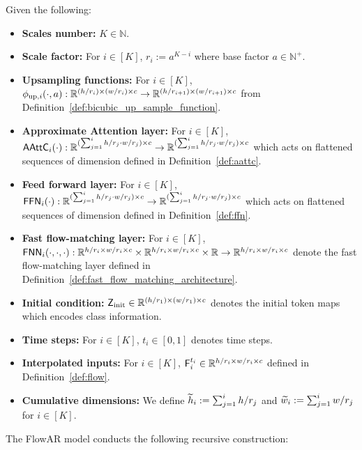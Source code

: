 \begin{definition}\label{def:fast_flow_architecture_inference}
    Given the following:
    \begin{itemize}
        \item {\bf Scales number:} $K \in \mathbb{N}$.
        \item {\bf Scale factor:} For $i \in [K]$, $r_i:= a^{K-i}$ where base factor $a \in \mathbb{N}^+$.
        \item {\bf Upsampling functions:}  For $i \in [K]$, $\phi_{\mathrm{up},i}(\cdot,a): \mathbb{R}^{(h/r_i) \times (w/r_i) \times c}\to \mathbb{R}^{(h/r_{i+1}) \times (w/r_{i+1}) \times c}$ from Definition~\ref{def:bicubic_up_sample_function}.
        \item {\bf Approximate Attention layer:}  For $i \in [K]$, $\mathsf{AAttC}_i(\cdot):\mathbb{R}^{(\sum_{j=1}^i h/r_j \cdot w/r_{j})\times c} \to \mathbb{R}^{(\sum_{j=1}^i h/r_j \cdot w/r_{j})\times c}$ which acts on flattened sequences of dimension defined in Definition~\ref{def:aattc}.
        \item {\bf Feed forward layer: } For $i \in [K]$, $\mathsf{FFN}_i(\cdot): \mathbb{R}^{(\sum_{j=1}^i h/r_j \cdot w/r_{j})\times c} \to \mathbb{R}^{(\sum_{j=1}^i h/r_j \cdot w/r_{j})\times c}$ which acts on flattened sequences of dimension defined in Definition~\ref{def:ffn}.
        \item {\bf Fast flow-matching layer:} For $i \in [K]$, $\mathsf{FNN}_i(\cdot,\cdot,\cdot):\mathbb{R}^{h/r_i \times w/r_i \times c}\times \mathbb{R}^{h/r_i \times w/r_i \times c}\times \mathbb{R} \to \mathbb{R}^{h/r_i \times w/r_i \times c}$ denote the fast flow-matching layer defined in Definition~\ref{def:fast_flow_matching_architecture}.
        \item {\bf Initial condition:} $\mathsf{Z}_{\mathrm{init}} \in \mathbb{R}^{(h/r_1) \times (w/r_1) \times c}$ denotes the initial token maps which encodes class information.
        \item {\bf Time steps:} For $i \in [K]$, $t_i \in [0,1]$ denotes time steps.
        \item {\bf Interpolated inputs:} For $i \in [K]$, $\mathsf{F}_i^{t_i} \in \mathbb{R}^{h/r_i \times w/r_i \times c}$ defined in Definition~\ref{def:flow}.
        \item {\bf Cumulative dimensions:} We define $\widetilde{h}_i := \sum_{j=1}^i h/r_j$ and  $\widetilde{w}_i := \sum_{j=1}^i w/r_j$ for $i \in [K]$.
    \end{itemize}
    The FlowAR model conducts the following recursive construction:
    \begin{itemize}

\end{itemize}
\end{definition}
